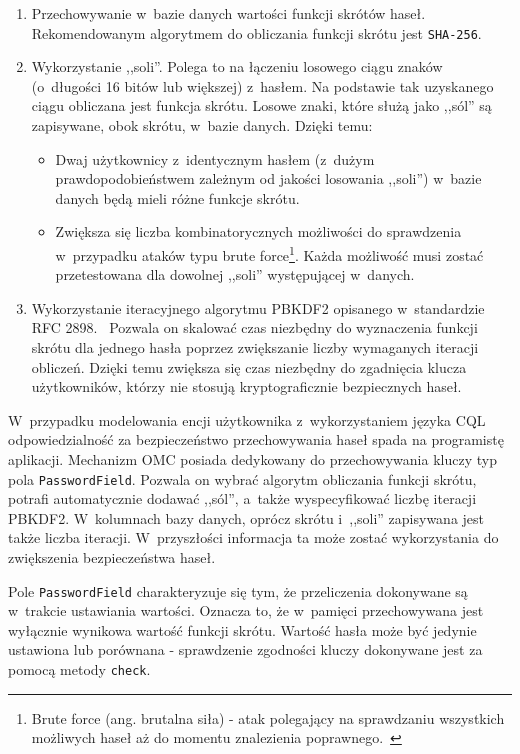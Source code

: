 \begin{enumerate}
	\item Przechowywanie w~bazie danych wartości funkcji skrótów haseł. Rekomendowanym algorytmem do obliczania funkcji skrótu jest \verb+SHA-256+.
	\item Wykorzystanie ,,soli''. Polega to na łączeniu losowego ciągu znaków (o~długości 16 bitów lub większej) z~hasłem. Na podstawie tak uzyskanego ciągu obliczana jest funkcja skrótu. Losowe znaki, które służą jako ,,sól'' są zapisywane, obok skrótu, w~bazie danych. Dzięki temu:
		\begin{itemize}
			\item Dwaj użytkownicy z~identycznym hasłem (z~dużym prawdopodobieństwem zależnym od jakości losowania ,,soli'') w~bazie danych będą mieli różne funkcje skrótu.
			\item Zwiększa się liczba kombinatorycznych możliwości do sprawdzenia w~przypadku ataków typu brute force\footnote{Brute force (ang. brutalna siła) - atak polegający na sprawdzaniu wszystkich możliwych haseł aż do momentu znalezienia poprawnego.~\cite{brute_force_definition}}. Każda możliwość musi zostać przetestowana dla dowolnej ,,soli'' występującej w~danych.
		\end{itemize}
	\item Wykorzystanie iteracyjnego algorytmu PBKDF2 opisanego w~standardzie RFC 2898.~\cite{rfc_2898} Pozwala on skalować czas niezbędny do wyznaczenia funkcji skrótu dla jednego hasła poprzez zwiększanie liczby wymaganych iteracji obliczeń. Dzięki temu zwiększa się czas niezbędny do zgadnięcia klucza użytkowników, którzy nie stosują kryptograficznie bezpiecznych haseł.
\end{enumerate}

W~przypadku modelowania encji użytkownika z~wykorzystaniem języka CQL odpowiedzialność za bezpieczeństwo przechowywania haseł spada na programistę aplikacji. Mechanizm OMC posiada dedykowany do przechowywania kluczy typ pola \verb+PasswordField+. Pozwala on wybrać algorytm obliczania funkcji skrótu, potrafi automatycznie dodawać ,,sól'', a~także wyspecyfikować liczbę iteracji PBKDF2. W~kolumnach bazy danych, oprócz skrótu i~,,soli'' zapisywana jest także liczba iteracji. W~przyszłości informacja ta może zostać wykorzystania do zwiększenia bezpieczeństwa haseł.

Pole \verb+PasswordField+ charakteryzuje się tym, że przeliczenia dokonywane są w~trakcie ustawiania wartości. Oznacza to, że w~pamięci przechowywana jest wyłącznie wynikowa wartość funkcji skrótu. Wartość hasła może być jedynie ustawiona lub porównana - sprawdzenie zgodności kluczy dokonywane jest za pomocą metody \verb+check+.

